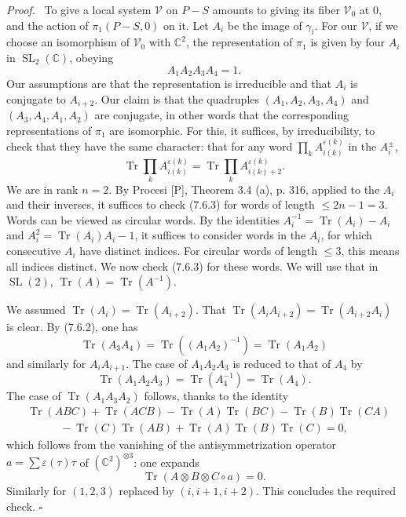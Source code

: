 \documentclass[10pt]{article}
\newcommand{\C}{\mathbb C}
\newcommand{\SL}{\operatorname{SL}}
\newcommand{\Tr}{\operatorname{Tr}}
\theoremstyle{deligne}
\newenvironment{proofdel}[1][Proof.]{\textit{#1}\ }{\hfill$\square$}
\begin{document}
\begin{proofdel}
To give a local system $\mathcal V$ on $P-S$ amounts to giving its fiber $\mathcal V_0$ at $0$, and the action of $\pi_1(P-S,0)$ on it. Let $A_i$ be the image of $\gamma_i$. For our $\mathcal V$, if we choose an isomorphism of $\mathcal V_0$ with $\C^2$, the representation of $\pi_1$ is given by four $A_i$ in $\SL_2(\C)$, obeying
\begin{equation}\tag{7.6.2}
A_1A_2A_3A_4=1.
\end{equation}
Our assumptions are that the representation is irreducible and that $A_i$ is conjugate to $A_{i+2}$. Our claim is that the quadruples $(A_1,A_2,A_3,A_4)$ and $(A_3,A_4,A_1,A_2)$ are conjugate, in other words that the corresponding representations of $\pi_1$ are isomorphic. For this, it suffices, by irreducibility, to check that they have the same character: that for any word $\prod_k A_{i(k)}^{\varepsilon(k)}$ in the $A_i^{\pm}$,
\begin{equation}\tag{7.6.3}
\Tr\prod_k A_{i(k)}^{\varepsilon(k)}=\Tr\prod_k A_{i(k)+2}^{\varepsilon(k)}.
\end{equation}
We are in rank $n=2$. By Procesi [P], Theorem 3.4 (a), p. 316, applied to the $A_i$ and their inverses, it suffices to check (7.6.3) for words of length $\le 2n-1=3$. Words can be viewed as circular words. By the identities $A_i^{-1}=\Tr(A_i)-A_i$ and $A_i^2=\Tr(A_i)A_i-1$, it suffices to consider words in the $A_i$, for which consecutive $A_i$ have distinct indices. For circular words of length $\le3$, this means all indices distinct. We now check (7.6.3) for these words. We will use that in $\SL(2)$, $\Tr(A)=\Tr(A^{-1})$.

We assumed $\Tr(A_i)=\Tr(A_{i+2})$. That $\Tr(A_iA_{i+2})=\Tr(A_{i+2}A_i)$ is clear. By (7.6.2), one has
\[
\Tr(A_3A_4)=\Tr((A_1A_2)^{-1})=\Tr(A_1A_2)
\]
and similarly for $A_iA_{i+1}$. The case of $A_1A_2A_3$ is reduced to that of $A_4$ by
\[
\Tr(A_1A_2A_3)=\Tr(A_4^{-1})=\Tr(A_4).
\]
The case of $\Tr(A_1A_3A_2)$ follows, thanks to the identity
\begin{equation}\tag{7.6.4}
\begin{aligned}
&\Tr(ABC)+\Tr(ACB)-\Tr(A)\Tr(BC)-\Tr(B)\Tr(CA)\\
&\hspace{3em}-\Tr(C)\Tr(AB)+\Tr(A)\Tr(B)\Tr(C)=0,
\end{aligned}
\end{equation}
which follows from the vanishing of the antisymmetrization operator $a=\sum\varepsilon(\tau)\tau$ of $(\C^2)^{\otimes3}$: one expands
\[
\Tr(A\otimes B\otimes C\circ a)=0.
\]
Similarly for $(1,2,3)$ replaced by $(i,i+1,i+2)$. This concludes the required check.
\end{proofdel}
\end{document}
